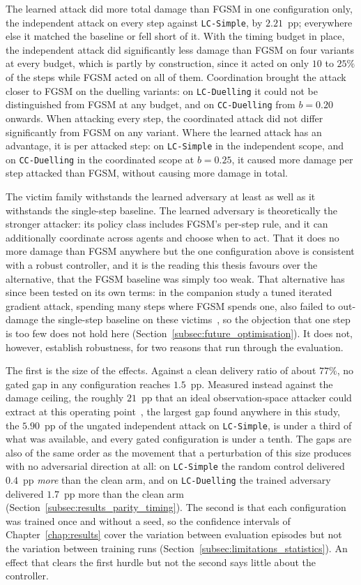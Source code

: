 The learned attack did more total damage than FGSM in one configuration only, the
independent attack on every step against \texttt{LC-Simple}, by $2.21$~pp; everywhere
else it matched the baseline or fell short of it. With the timing budget in place, the
independent attack did significantly less damage than FGSM on four variants at every
budget, which is partly by construction, since it acted on only $10$ to $25\%$ of the
steps while FGSM acted on all of them. Coordination brought the attack closer to FGSM
on the duelling variants: on \texttt{LC-Duelling} it could not be distinguished from
FGSM at any budget, and on \texttt{CC-Duelling} from $b = 0.20$ onwards. When attacking
every step, the coordinated attack did not differ significantly from FGSM on any
variant. Where the learned attack has an advantage, it is per attacked step: on
\texttt{LC-Simple} in the independent scope, and on \texttt{CC-Duelling} in the
coordinated scope at $b = 0.25$, it caused more damage per step attacked than FGSM,
without causing more damage in total.

The victim family withstands the learned
adversary at least as well as it withstands the single-step baseline. The learned adversary
is theoretically the stronger attacker: its policy class includes FGSM's per-step rule,
and it can additionally coordinate across agents and choose when to act. That it does no
more damage than FGSM anywhere but the one configuration above is consistent with a
robust controller, and it is the reading this thesis favours over the alternative, that
the FGSM baseline was simply too weak. That alternative has since been tested on its own
terms: in the companion study a tuned iterated gradient attack, spending many steps where
FGSM spends one, also failed to out-damage the single-step baseline on these
victims~\cite{martins2026fgsm}, so the objection that one step is too few does not hold
here (Section~\ref{subsec:future_optimisation}). It does
not, however, establish robustness, for two reasons that run through the evaluation.

The first is the size of the effects. Against a clean delivery ratio of about $77\%$, no
gated gap in any configuration reaches $1.5$~pp. Measured instead against the damage
ceiling, the roughly $21$~pp that an ideal observation-space attacker could extract at
this operating point~\cite{martins2026fgsm}, the largest gap found anywhere in this
study, the $5.90$~pp of the ungated independent attack on \texttt{LC-Simple}, is under a
third of what was available, and every gated configuration is under a tenth. The gaps
are also of the same order as the movement that a perturbation of this size produces
with no adversarial direction at all: on
\texttt{LC-Simple} the random control delivered $0.4$~pp \emph{more} than the clean arm,
and on \texttt{LC-Duelling} the trained adversary delivered $1.7$~pp more than the clean
arm (Section~\ref{subsec:results_parity_timing}). The second is that each configuration
was trained once and without a seed, so the confidence intervals of
Chapter~\ref{chap:results} cover the variation between evaluation episodes but not the
variation between training runs (Section~\ref{subsec:limitations_statistics}). An effect
that clears the first hurdle but not the second says little about the controller.

